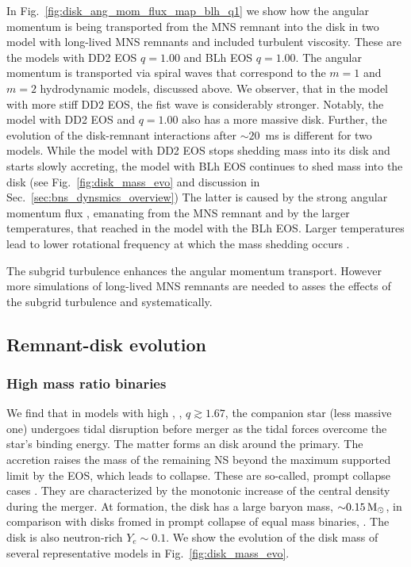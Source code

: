 In Fig.~\ref{fig:disk_ang_mom_flux_map_blh_q1} we show how the angular momentum is 
being transported from the \ac{MNS} remnant into the disk in two model with long-lived 
\ac{MNS} remnants and included turbulent viscosity.
%
These are the models with DD2 \ac{EOS} $q=1.00$ and BLh \ac{EOS} $q=1.00$.
%
The angular momentum is transported via spiral waves that correspond to the 
$m=1$ and $m=2$ hydrodynamic models, discussed above.
We observer, that in the model with more stiff DD2 \ac{EOS},
the fist wave is considerably stronger. Notably, the model with DD2 \ac{EOS} and $q=1.00$  
also has a more massive disk.
%
Further, the evolution of the disk-remnant interactions after $\sim20$~ms \pmerg{} 
is different for two models. While the model with DD2 \ac{EOS} stops 
shedding mass into its disk and starts slowly accreting, the model with BLh \ac{EOS} 
continues to shed mass into the disk (see Fig.~\ref{fig:disk_mass_evo} and discussion in
Sec.~\ref{sec:bns_dynsmics_overview})
%
The latter is caused by the strong angular momentum flux , 
emanating from the \ac{MNS} remnant and by the larger temperatures, 
that reached in the model with the BLh \ac{EOS}.
%
Larger temperatures lead to lower rotational frequency at which the mass 
shedding occurs \citep{Kaplan:2013wra}. 

The subgrid turbulence enhances the angular momentum transport. However more simulations of long-lived 
\ac{MNS} remnants are needed to asses the effects of the 
subgrid turbulence and \mr{} systematically. 


\subsection{Remnant-disk evolution}

\subsubsection*{High mass ratio binaries}

We find that in models with high \mr{}, \eg, $q\gtrsim1.67$, the companion star (less 
massive one) undergoes tidal disruption before merger as the tidal forces overcome the star's 
binding energy. The matter forms an disk around the primary.
The accretion raises the mass of the remaining \ac{NS} beyond the maximum supported limit by the 
\ac{EOS}, which leads to collapse. 
These are so-called, prompt collapse cases \citep{Radice:2020ddv,Bernuzzi:2020tgt,Bernuzzi:2020txg}.
They are characterized by the monotonic increase of the central density during the merger.
%
At formation, the disk has a large baryon mass, ${\sim}0.15\,{\text{M}_{\odot}}$, in comparison with 
disks fromed in prompt collapse of equal mass binaries, \citep[\eg][]{Radice:2018pdn}.  
The disk is also neutron-rich $Y_e\sim 0.1$.
%
We show the evolution of the disk mass of several representative models in Fig.~\ref{fig:disk_mass_evo}.

